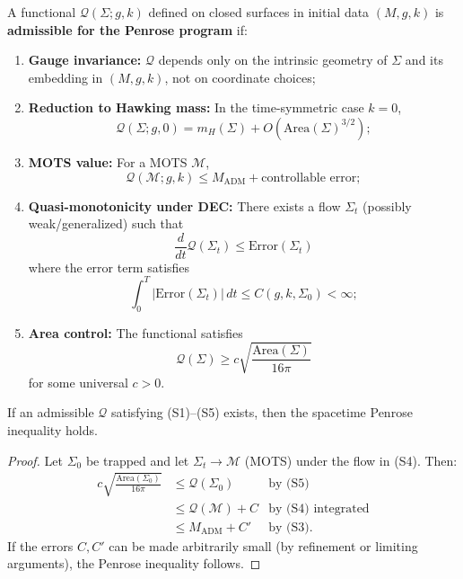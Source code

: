 \begin{definition}
\label{def:structural-constraints}
A functional $\mathcal{Q}(\Sigma; g, k)$ defined on closed surfaces in initial data $(M,g,k)$ is \textbf{admissible for the Penrose program} if:
\begin{enumerate}[\textbf{(S1)}]
\item \textbf{Gauge invariance:} $\mathcal{Q}$ depends only on the intrinsic geometry of $\Sigma$ and its embedding in $(M,g,k)$, not on coordinate choices;
\item \textbf{Reduction to Hawking mass:} In the time-symmetric case $k = 0$, 
\[
\mathcal{Q}(\Sigma; g, 0) = m_H(\Sigma) + O(\mathrm{Area}(\Sigma)^{3/2});
\]
\item \textbf{MOTS value:} For a MOTS $\mathcal{M}$,
\[
\mathcal{Q}(\mathcal{M}; g, k) \leq M_{\mathrm{ADM}} + \text{controllable error};
\]
\item \textbf{Quasi-monotonicity under DEC:} There exists a flow $\Sigma_t$ (possibly weak/generalized) such that
\[
\frac{d}{dt}\mathcal{Q}(\Sigma_t) \leq \text{Error}(\Sigma_t)
\]
where the error term satisfies
\[
\int_0^{T} |\text{Error}(\Sigma_t)| \, dt \leq C(g,k,\Sigma_0) < \infty;
\]
\item \textbf{Area control:} The functional satisfies
\[
\mathcal{Q}(\Sigma) \geq c \sqrt{\frac{\mathrm{Area}(\Sigma)}{16\pi}}
\]
for some universal $c > 0$.
\end{enumerate}
\end{definition}

\begin{proposition}
If an admissible $\mathcal{Q}$ satisfying (S1)--(S5) exists, then the spacetime Penrose inequality holds.
\end{proposition}

\begin{proof}
Let $\Sigma_0$ be trapped and let $\Sigma_t \to \mathcal{M}$ (MOTS) under the flow in (S4). Then:
\begin{align}
c\sqrt{\frac{\mathrm{Area}(\Sigma_0)}{16\pi}} &\leq \mathcal{Q}(\Sigma_0) & \text{by (S5)} \\
&\leq \mathcal{Q}(\mathcal{M}) + C & \text{by (S4) integrated} \\
&\leq M_{\mathrm{ADM}} + C' & \text{by (S3)}.
\end{align}
If the errors $C, C'$ can be made arbitrarily small (by refinement or limiting arguments), the Penrose inequality follows.
\end{proof}

